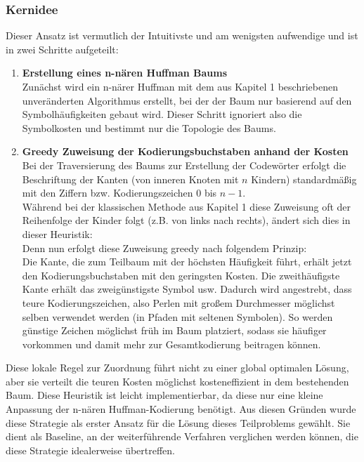 \documentclass[a4paper,10pt,ngerman]{scrartcl}
\begin{document}
\subsubsection{Kernidee}
Dieser Ansatz ist vermutlich der Intuitivste und am wenigsten aufwendige und ist in zwei Schritte aufgeteilt: 
\\\newline
\begin{enumerate}
  \item \textbf{Erstellung eines n-nären Huffman Baums} \\
      Zunächst wird ein n-närer Huffman mit dem aus Kapitel 1 beschriebenen unveränderten Algorithmus erstellt, bei der der Baum nur basierend auf den Symbolhäufigkeiten gebaut wird. Dieser Schritt ignoriert also die Symbolkosten und bestimmt nur die Topologie des Baums. 
  \item \textbf{Greedy Zuweisung der Kodierungsbuchstaben anhand der Kosten}\\
  Bei der Traversierung des Baums zur Erstellung der Codewörter erfolgt die Beschriftung der Kanten (von inneren Knoten mit $n$ Kindern) standardmäßig mit den Ziffern bzw. Kodierungszeichen $0$ bis $n-1$.\\
  Während bei der klassischen Methode aus Kapitel 1 diese Zuweisung oft der Reihenfolge der Kinder folgt (z.B. von links nach rechts), ändert sich dies in dieser Heuristik:\\
  Denn nun erfolgt diese Zuweisung greedy nach folgendem Prinzip: \\
  Die Kante, die zum Teilbaum mit der höchsten Häufigkeit führt, erhält jetzt den Kodierungsbuchstaben mit den geringsten Kosten. Die zweithäufigste Kante erhält das zweigünstigste Symbol usw. Dadurch wird angestrebt, dass teure Kodierungszeichen, also Perlen mit großem Durchmesser möglichst selben verwendet werden (in Pfaden mit seltenen Symbolen). So werden günstige Zeichen möglichst früh im Baum platziert, sodass sie häufiger vorkommen und damit mehr zur Gesamtkodierung beitragen können.\\
\end{enumerate}
Diese lokale Regel zur Zuordnung führt nicht zu einer global optimalen Lösung, aber sie verteilt die teuren Kosten möglichst kosteneffizient in dem bestehenden Baum. Diese Heuristik ist leicht implementierbar, da diese nur eine kleine Anpassung der n-nären Huffman-Kodierung benötigt. Aus diesen Gründen wurde diese Strategie als erster Ansatz für die Lösung dieses Teilproblems gewählt. Sie dient als Baseline, an der weiterführende Verfahren verglichen werden können, die diese Strategie idealerweise übertreffen. 
\end{document}
